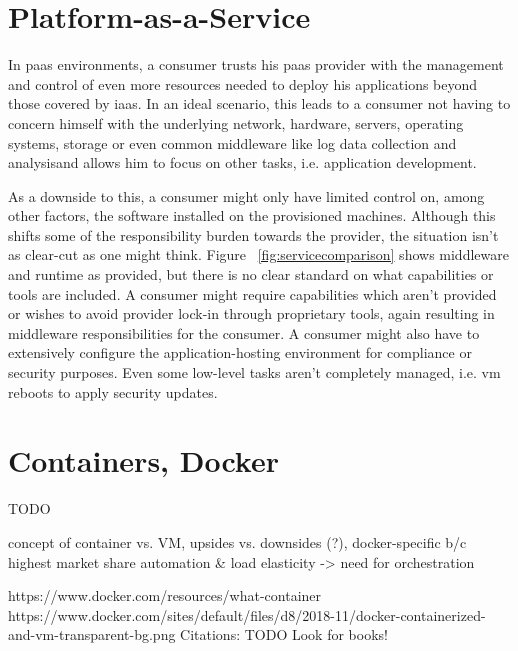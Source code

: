 
\section{Platform-as-a-Service}

In \gls{paas} environments, a consumer trusts his \gls{paas} provider with the management and control of even more resources needed to deploy his applications beyond those covered by \gls{iaas}.\footnotemark
{}
In an ideal scenario, this leads to a consumer not having to concern himself with the underlying network, hardware, servers, operating systems, storage or even common middleware like log data collection and analysis\footnotemark and allows him to focus on other tasks, i.e. application development.


As a downside to this, a consumer might only have limited control on, among other factors, the software installed on the provisioned machines. 
Although this shifts some of the responsibility burden towards the provider, the situation isn't as clear-cut as one might think. 
Figure ~\ref{fig:servicecomparison} shows middleware and runtime as provided, but there is no clear standard on what capabilities or tools are included.
A consumer might require capabilities which aren't provided or wishes to avoid provider lock-in through proprietary tools, 
again resulting in middleware responsibilities for the consumer. 
A consumer might also have to extensively configure the application-hosting environment for compliance or security purposes. 
Even some low-level tasks aren't completely managed, i.e. \gls{vm} reboots to apply security updates.\footnotemark


\section{Containers, Docker}
TODO

concept of container vs. VM, upsides vs. downsides (?), docker-specific b/c highest market share
automation \& load elasticity -> need for orchestration

https://www.docker.com/resources/what-container\\
https://www.docker.com/sites/default/files/d8/2018-11/docker-containerized-and-vm-transparent-bg.png
Citations: TODO Look for books! 


